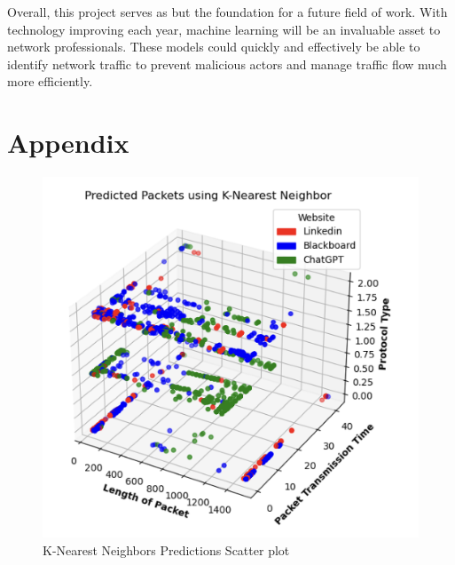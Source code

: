 \documentclass[10pt,sigconf,letterpaper,nonacm]{acmart}
\begin{document}
Overall, this project serves as but the foundation for a future field of work. With technology improving each year, machine learning will be an invaluable asset to network professionals. 
These models could quickly and effectively be able to identify network traffic to prevent malicious actors and manage traffic flow much more efficiently. 


\section{Appendix}

\begin{figure}[!h]
  \centering
  \includegraphics[width=1\linewidth]{Figures_and_Graphs/PredictedPacketsScatterKNN.png}
  \caption{K-Nearest Neighbors Predictions Scatter plot}
  \label{fig:knn_scatter}
\end{figure}
\end{document}

